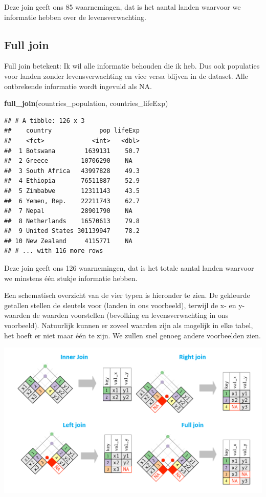 \documentclass[]{tufte-book}
\newenvironment{Shaded}{}{}
\newcommand{\KeywordTok}[1]{\textcolor[rgb]{0.00,0.44,0.13}{\textbf{#1}}}
\newcommand{\NormalTok}[1]{#1}
\begin{document}
Deze join geeft ons 85 waarnemingen, dat is het aantal landen waarvoor we informatie hebben over de levensverwachting.

\hypertarget{full-join}{%
\subsection{Full join}\label{full-join}}

Full join betekent: Ik wil alle informatie behouden die ik heb. Dus ook populaties voor landen zonder levensverwachting en vice versa blijven in de dataset. Alle ontbrekende informatie wordt ingevuld als NA.

\begin{Shaded}
\begin{Highlighting}[]
\KeywordTok{full_join}\NormalTok{(countries_population, countries_lifeExp)}
\end{Highlighting}
\end{Shaded}

\begin{verbatim}
## # A tibble: 126 x 3
##    country             pop lifeExp
##    <fct>             <int>   <dbl>
##  1 Botswana        1639131    50.7
##  2 Greece         10706290    NA  
##  3 South Africa   43997828    49.3
##  4 Ethiopia       76511887    52.9
##  5 Zimbabwe       12311143    43.5
##  6 Yemen, Rep.    22211743    62.7
##  7 Nepal          28901790    NA  
##  8 Netherlands    16570613    79.8
##  9 United States 301139947    78.2
## 10 New Zealand     4115771    NA  
## # ... with 116 more rows
\end{verbatim}

Deze join geeft ons 126 waarnemingen, dat is het totale aantal landen waarvoor we minstens één stukje informatie hebben.

Een schematisch overzicht van de vier typen is hieronder te zien. De gekleurde getallen stellen de sleutels voor (landen in ons voorbeeld), terwijl de x- en y-waarden de waarden voorstellen (bevolking en levensverwachting in ons voorbeeld). Natuurlijk kunnen er zoveel waarden zijn als mogelijk in elke tabel, het hoeft er niet maar één te zijn. We zullen snel genoeg andere voorbeelden zien.

\includegraphics[width=1\linewidth]{images/join_types}
\end{document}
